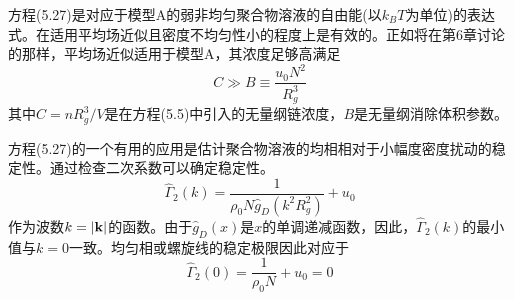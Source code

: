 方程(5.27)是对应于模型A的弱非均匀聚合物溶液的自由能(以$k_BT$为单位)的表达式。在适用平均场近似且密度不均匀性小的程度上是有效的。正如将在第6章讨论的那样，平均场近似适用于模型A，其浓度足够高满足
\begin{equation}
C\gg B\equiv\frac{u_0N^2}{R_g^3}
\end{equation}
其中$C=nR_g^3/V$是在方程(5.5)中引入的无量纲链浓度，$B$是无量纲消除体积参数。

方程(5.27)的一个有用的应用是估计聚合物溶液的均相相对于小幅度密度扰动的稳定性。通过检查二次系数可以确定稳定性。
\begin{equation}
\hat{\Gamma}_2(k)=\frac{1}{\rho_0N\hat{g}_D(k^2R_g^2)}+u_0
\end{equation}
作为波数$k=\left|\mathbf{k}\right|$的函数。由于$\hat{g}_D(x)$是$x$的单调递减函数，因此，$\hat{\Gamma}_2(k)$的最小值与$k=0$一致。均匀相或螺旋线的稳定极限因此对应于
\begin{equation}
\hat{\Gamma}_2(0)=\frac{1}{\rho_0N}+u_0=0
\end{equation}

















































































